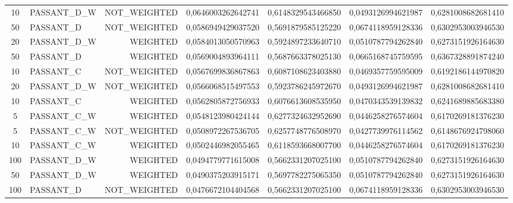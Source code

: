 \begin{table}[H]
{\begin{tabular}{ c l r c c c c }
				10 & PASSANT\_D\_W & NOT\_WEIGHTED & 0,0646003262642741 & 0,6148329543466850 & 0,0493126994621987 & 0,6281008682681410 \\
				
				50 &  PASSANT\_D & NOT\_WEIGHTED & 0,0586949429037520 & 0,5691879585125220 & 0,0674118959128336 & 0,6302953003946530 \\
				
				20 & PASSANT\_D\_W &   WEIGHTED & 0,0584013050570963 & 0,5924897233640710 & 0,0510787794262840 & 0,6273151926164630 \\
				
				50 &  PASSANT\_D &   WEIGHTED & 0,0569004893964111 & 0,5687663378025130 & 0,0665168745759595 & 0,6367328891874240 \\
				
				10 &  PASSANT\_C & NOT\_WEIGHTED & 0,0567699836867863 & 0,6087108623403880 & 0,0469357759595009 & 0,6192186144970820 \\
				
				20 & PASSANT\_D\_W & NOT\_WEIGHTED & 0,0566068515497553 & 0,5923786245972670 & 0,0493126994621987 & 0,6281008682681410 \\
				
				10 &  PASSANT\_C &   WEIGHTED & 0,0562805872756933 & 0,6076613608535950 & 0,0470343539139832 & 0,6241689885683380 \\
				
				5 & PASSANT\_C\_W &   WEIGHTED & 0,0548123980424144 & 0,6277324632952690 & 0,0446258276574604 & 0,6170269181376230 \\
				
				5 & PASSANT\_C\_W & NOT\_WEIGHTED & 0,0508972267536705 & 0,6257748776508970 & 0,0427739976114562 & 0,6148676924798060 \\
				
				10 & PASSANT\_C\_W &   WEIGHTED & 0,0502446982055465 & 0,6118593668007700 & 0,0446258276574604 & 0,6170269181376230 \\
				
				100 & PASSANT\_D\_W &   WEIGHTED & 0,0494779771615008 & 0,5662331207025100 & 0,0510787794262840 & 0,6273151926164630 \\
				
				50 & PASSANT\_D\_W &   WEIGHTED & 0,0490375203915171 & 0,5697782275065350 & 0,0510787794262840 & 0,6273151926164630 \\
				
				100 &  PASSANT\_D & NOT\_WEIGHTED & 0,0476672104404568 & 0,5662331207025100 & 0,0674118959128336 & 0,6302953003946530 \\
				

\end{tabular}}
\end{table}

